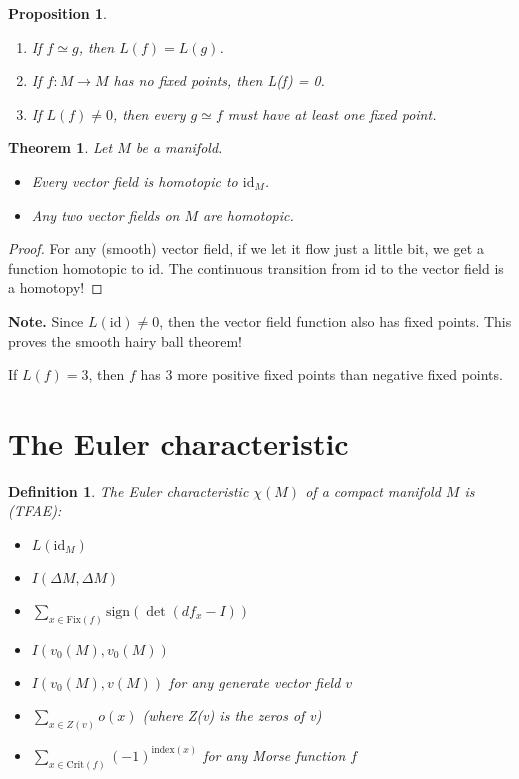 \documentclass[11pt]{amsbook}
\newenvironment{dateenv}{
	\vspace{1em}
}{
	\vspace{1em}
}
\newcommand{\mydate}[4]{
	\newdate{#1}{#2}{#3}{#4}
	\begin{dateenv}
		\hfill\displaydate{#1}
	\end{dateenv}
}
\theoremstyle{mystyle} \newtheorem{thrm}[thm]{Theorem}
\theoremstyle{mystyle} \newtheorem{defi}[thm]{Definition}
\theoremstyle{mystyle} \newtheorem{coro}[thm]{Corollary}
\theoremstyle{mystyle} \newtheorem{propo}[thm]{Proposition}
\theoremstyle{mystyle} \newtheorem{lemm}[thm]{Lemma}
\numberwithin{thm}{section}
\newcommand{\id}{\text{id}}
\newcommand{\Fix}{\text{Fix}}
\newcommand{\sign}{\text{sign}}
\newcommand{\Crit}{\text{Crit}}
\newcommand{\homotopic}{\simeq}
\newcommand{\de}{\emph}
\begin{document}
\begin{propo}
	\begin{enumerate}
		\item If $f \homotopic g$, then $L(f) = L(g)$.

		\item If $f: M \to M$ has no fixed points, then L(f) = 0.

		\item If $L(f) \neq 0$, then every $g \homotopic f$ must have at least one fixed point.
	\end{enumerate}
\end{propo}

\begin{thrm}
	Let $M$ be a manifold.
	\begin{itemize}
		\item Every vector field is homotopic to $\id_M$.
		\item Any two vector fields on $M$ are homotopic.
	\end{itemize}
\end{thrm}
\begin{proof}
	For any (smooth) vector field, if we let it flow just a little bit, we get a function homotopic to $\id$. The continuous transition from $\id$ to the vector field is a homotopy!
\end{proof}

\textbf{Note.}
Since $L(\id) \neq 0$, then the vector field function also has fixed points. This proves the smooth hairy ball theorem!

\begin{rmk}
	If $L(f) = 3$, then $f$ has 3 more positive fixed points than negative fixed points.
\end{rmk}

\mydate{d18}{28}{11}{2016}

\section{The Euler characteristic}

\begin{defi}
	The \de{Euler characteristic} $\chi(M)$ of a compact manifold $M$ is (TFAE):
	\begin{itemize}
		\item $L(\id_M)$
		\item $I(\Delta M, \Delta M)$
		\item $\sum_{x \in \Fix(f)} \sign(\det(df_x - I))$
		\item $I(v_0(M), v_0(M))$
		\item $I(v_0(M), v(M))$ for any generate vector field $v$
		\item $\sum_{x \in Z(v)} o(x)$ (where Z(v) is the zeros of v)
		\item $\sum_{x \in \Crit(f)} (-1)^{\text{index}(x)}$ for any Morse function $f$
	\end{itemize}
\end{defi}
\end{document}
